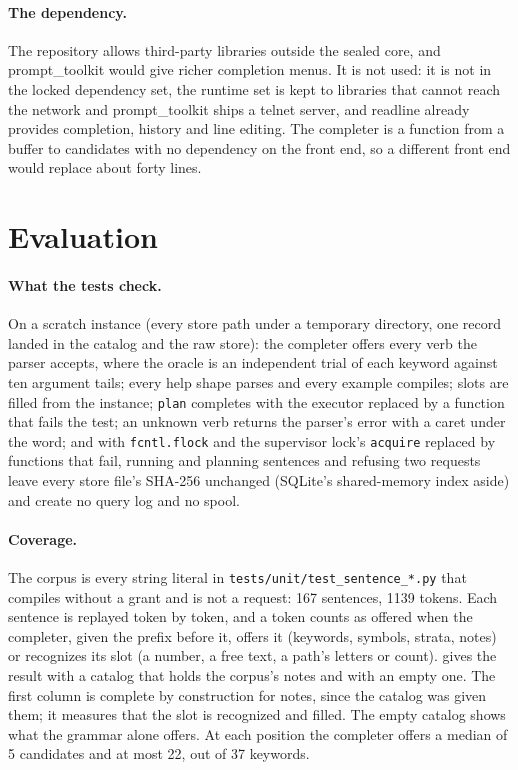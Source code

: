 \documentclass[11pt]{article}
\theoremstyle{plain}
\theoremstyle{definition}
\theoremstyle{remark}
\newcommand{\code}[1]{\texttt{#1}}
\begin{document}
\paragraph{The dependency.} The repository allows third-party libraries outside the sealed core,
and prompt\_toolkit \cite{prompttoolkit} would give richer completion menus. It is not used: it is
not in the locked dependency set, the runtime set is kept to libraries that cannot reach the
network and prompt\_toolkit ships a telnet server, and readline already provides completion,
history and line editing. The completer is a function from a buffer to candidates with no
dependency on the front end, so a different front end would replace about forty lines.

\section{Evaluation}

\paragraph{What the tests check.} On a scratch instance (every store path under a temporary
directory, one record landed in the catalog and the raw store): the completer offers every verb the
parser accepts, where the oracle is an independent trial of each keyword against ten argument
tails; every help shape parses and every example compiles; slots are filled from the instance;
\code{plan} completes with the executor replaced by a function that fails the test; an unknown verb
returns the parser's error with a caret under the word; and with \code{fcntl.flock} and the
supervisor lock's \code{acquire} replaced by functions that fail, running and planning sentences
and refusing two requests leave every store file's SHA-256 unchanged (SQLite's shared-memory
index aside) and create no query log and no spool.

\paragraph{Coverage.} The corpus is every string literal in \code{tests/unit/test\_sentence\_*.py}
that compiles without a grant and is not a request: 167 sentences, 1139 tokens. Each sentence is
replayed token by token, and a token counts as offered when the completer, given the prefix before
it, offers it (keywords, symbols, strata, notes) or recognizes its slot (a number, a free text, a
path's letters or count).  gives the result with a catalog that holds the
corpus's notes and with an empty one. The first column is complete by construction for notes,
since the catalog was given them; it measures that the slot is recognized and filled. The empty
catalog shows what the grammar alone offers. At each position the completer offers a median of 5
candidates and at most 22, out of 37 keywords.
\end{document}
